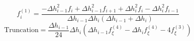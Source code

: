 \begin{equation} 
f^{{(1)}}_{i} = \frac{- \Delta h_{{i-1}}^{2} f_{i} + \Delta h_{{i-1}}^{2} f_{{i+1}} + \Delta h_{{i}}^{2} f_{i} - \Delta h_{{i}}^{2} f_{{i-1}}}{\Delta h_{{i-1}} \Delta h_{{i}} \left(\Delta h_{{i-1}} + \Delta h_{{i}}\right)}
 \end{equation}\begin{equation} 
\text{Truncation} = \frac{\Delta h_{{i-1}}}{24} \Delta h_{{i}} \left(\Delta h_{{i-1}} f^{{(4)}}_{{\xi}} - \Delta h_{{i}} f^{{(4)}}_{{\xi}} - 4 f^{{(3)}}_{{\xi}}\right)
 \end{equation}
